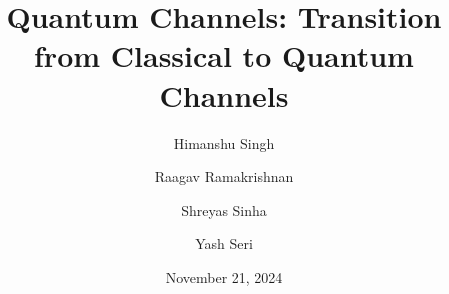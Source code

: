 \documentclass[a4paper]{article}
\title{Quantum Channels: Transition from Classical to Quantum Channels}
\author{Himanshu Singh \and Raagav Ramakrishnan \and Shreyas Sinha \and Yash Seri}
\date{November 21, 2024}
\newcommand{\pageauthor}{}
\begin{document}
\maketitle
\tableofcontents
\clearpage

\renewcommand{\pageauthor}{Shreyas Sinha}


\renewcommand{\pageauthor}{Yash Seri}




\renewcommand{\pageauthor}{Raagav Ramakrishnan}



\renewcommand{\pageauthor}{Himanshu Singh}



\renewcommand{\pageauthor}{Shreyas Sinha}



\renewcommand{\pageauthor}{}


\end{document}
